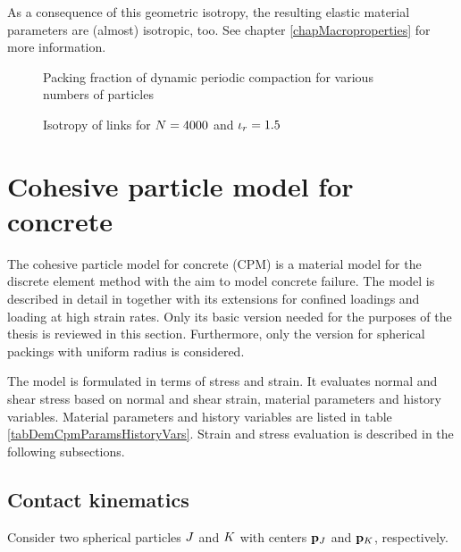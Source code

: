 As a consequence of this geometric isotropy, the resulting elastic material parameters are (almost) isotropic, too.
See chapter \ref{chapMacroproperties} for more information.

\begin{figure}[htb]
	\centering
	\caption[Packing fraction of dynamic periodic compaction]{Packing fraction of dynamic periodic compaction for various numbers of particles}
	\label{figDemPackingFraction}
\end{figure}

\begin{figure}
	\centering
	\vspace{-2cm}
	\caption{Isotropy of links for $N=4000$ and $\iota_r=1{.}5$}
	\label{figDemPackingIsotropy}
\end{figure}









\section{Cohesive particle model for concrete}\label{secDemCpm}

The cohesive particle model for concrete (CPM) is a material model for the discrete element method with the aim to model concrete failure.
The model is described in detail in \cite{Smilauer2010a} together with its extensions for confined loadings and loading at high strain rates.
Only its basic version needed for the purposes of the thesis is reviewed in this section.
Furthermore, only the version for spherical packings with uniform radius is considered.

The model is formulated in terms of stress and strain.
It evaluates normal and shear stress based on normal and shear strain, material parameters and history variables.
Material parameters and history variables are listed in table \ref{tabDemCpmParamsHistoryVars}.
Strain and stress evaluation is described in the following subsections.

\subsection{Contact kinematics}
Consider two spherical particles $J$ and $K$ with centers $\particlePosition_\particleA$ and $\particlePosition_\particleB$, respectively.

